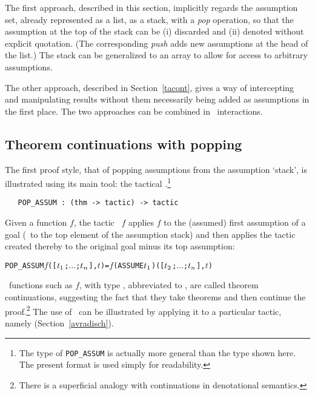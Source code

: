 {The first
approach, described in this section, implicitly regards the assumption
set, already represented as a list, as a stack, with a {\it pop\/}
operation, so that the assumption at the top of the stack can be (i) discarded
and (ii) denoted without explicit quotation.  (The corresponding {\it push\/}
adds new assumptions at the head of the list.)
The stack can be generalized to an array to allow for access to
arbitrary assumptions.

The other approach, described in Section~\ref{tacont},
gives a way of intercepting and manipulating results without them necessarily
being added as assumptions in the first place.  The two approaches can
be combined in \HOL\ interactions.


\subsection{Theorem continuations with popping}
\label{avra_manip1}

The first proof style, that of popping assumptions
 from the assumption
`stack',
 is illustrated using its main tool: the tactical
.\footnote{The type of {\tt POP\_ASSUM} is actually more general
than the type shown here. The present format is used simply for readability.}

\begin{boxed}\begin{verbatim}
   POP_ASSUM : (thm -> tactic) -> tactic
\end{verbatim}\end{boxed}

\noindent Given a function $f$, the tactic
\ $f$ applies $f$ to the (assumed) first
assumption of a goal (\ie\ to the top element of the assumption stack)
and then applies the tactic created thereby to the original goal
minus its top assumption:

\begin{hol}\begin{alltt}
   POP_ASSUM \(f\) ([\(t\sb{1}\);\(\ldots\);\(t\sb{n}\)],\(t\)) = \(f\) (ASSUME \(t\sb{1}\)) ([\(t\sb{2}\);\(\ldots\);\(t\sb{n}\)],\(t\))
\end{alltt}\end{hol}

\noindent \ML\ functions such as $f$,
with type , abbreviated to ,
are called theorem continuations,
 suggesting the fact that they
take theorems and then continue the proof.\footnote{There is a superficial analogy
with continuations in denotational semantics.}
The use of \ can be illustrated by applying it
to a particular tactic, namely  (Section~\ref{avradisch}).

}

